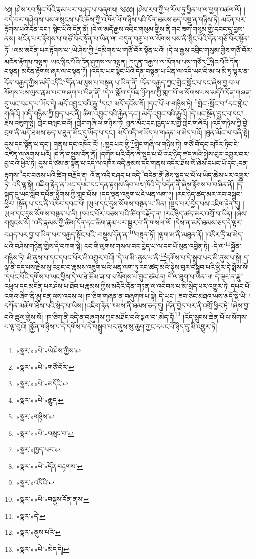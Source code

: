 ༄། །ཤེས་རབ་སྙིང་པོའི་རྣམ་པར་བཤད་པ་བཞུགས། ༄༅༅། །ཤེས་རབ་ཀྱི་ཕ་རོལ་ཏུ་ཕྱིན་པ་ལ་ཕྱག་འཚལ་ལོ། །བདེ་བར་གཤེགས་པས་གསུངས་པའི་ཆོས་ཀྱི་འཁོར་ལོ་གཉིས་པའི་དོན་ཐམས་ཅད་བསྡུ་ན་གཉིས་ཏེ། མངོན་པར་རྟོགས་པའི་དོན་དང་། སྙིང་པོའི་དོན་ནོ། །དེ་ལ་མདོ་རྒྱས་འབྲིང་གསུམ་གྱིས་ནི་གང་ཟག་གསུམ་གྱི་དབང་དུ་བྱས་ནས། མངོན་པར་རྟོགས་པ་གཙོ་བོར་སྟོན་པ་ཡིན་ལ། བདུན་བརྒྱ་པ་ལ་སོགས་པས་ནི་སྙིང་པོའི་དོན་གཙོ་བོར་སྟོན་ཏོ། །ལམ་མངོན་པར་རྟོགས་པ་:ཡེ་ཤེས་ཀྱི་\footnote{«སྣར་»«པེ་»ཡེ་ཤེས་ཀྱིས་}དམིགས་པ་གཙོ་བོར་སྟོན་པའོ། །དེ་ལ་རྒྱས་འབྲིང་གསུམ་གྱིས་གཙོ་བོར་མངོན་རྟོགས་བསྟན། ཡང་སྙིང་པོའི་དོན་ཤུགས་ལ་བསྟན། བདུན་བརྒྱ་པ་ལ་སོགས་པས་གཙོར་\footnote{«སྣར་»«པེ་»གཙོ་བོར་}སྙིང་པོའི་དོན་བསྟན། མངོན་རྟོགས་ཞར་ལ་བསྟན་ཏོ། །འདིར་ཡང་སྙིང་པོའི་དོན་བསྟན་པ་ཡིན་ལ་འདི་ཡང་བི་མ་ལ་མི་ཏྲ་ལྟར་ན་དོན་བརྒྱད་ཀྱིས་མདོ་འདིའི་\footnote{«སྣར་»«པེ་»མདོའི་}དོན་མ་ལུས་པ་བསྟན་པ་ཡིན་ནོ། །དོན་བརྒྱད་ཀྱང་གླེང་སློང་པ་དང་ཞེས་བྱ་བ་ལ་སོགས་པས་ལུས་རྣམ་པར་གཞག་པ་ཡིན་ནོ། །དེ་ལ་སློབ་དཔོན་ཕྱོགས་ཀྱི་གླང་པོ་ལ་སོགས་པས་མདོའི་དོན་གཞན་དུ་ཡང་བཤད་པ་ཡོད་དེ། མདོ་འབྱུང་བའི་རྒྱུ་\footnote{«སྣར་»«པེ་»རྒྱུད་}དང་། མདོ་དངོས་སོ། །དང་པོ་ལ་:གཉིས་ཏེ། \footnote{«སྣར་»གཉིས་}གླེང་:སློང་བ་\footnote{«སྣར་»«པེ་»བསླང་བ་}དང་གླེང་གཞིའོ། །འདི་གཉིས་ཀྱི་ཁྱད་པར་ནི། ཚིག་འབྱུང་བའི་རྐྱེན་དང་། མདོ་འབྱུང་བའི་རྒྱུའོ། །དེ་ཡང་སྔོན་བྱུང་བ་དང་། རྗེས་འཇུག་སྟེ། གླེང་བསླང་བའོ། །གླེང་གཞི་ལ་གཉིས་ཏེ། ཐུན་མོང་དང་ཁྱད་པར་གྱི་གླེང་གཞིའོ། །འདི་གཉིས་ཀྱི་བྱེ་བྲག་ནི་མདོ་ཐམས་ཅད་ལ་ཐུན་མོང་དུ་ཡོད་པ་དང་། མདོ་འདི་ལ་ཡོད་པ་གཞན་ལ་མེད་པའོ། །ཐུན་མོང་ལ་བཞི་སྟེ། དུས་དང་སྟོན་པ་དང་། གནས་དང་འཁོར་རོ། །:ཁྱད་པར་གྱི་\footnote{«སྣར་»ཁྱད་པར་}གླེང་གཞི་ལ་གཉིས་ཏེ། གཙོ་བོ་དང་འཁོར་ཏིང་ངེ་འཛིན་ལ་ཞུགས་པའོ། །དེ་ནི་བསྡུས་དོན་ནོ། །དགོས་པའི་དོན་ནི་སྡུད་པ་པོ་རང་ཉིད་ཚད་མའི་སྐྱེས་བུར་འགྱུར་བར་བྱ་བའི་ཕྱིར་ཏེ། དུས་དེ་ཙམ་ན་སྟོན་པ་འདི་ལ་འཁོར་འདི་རྣམས་དང་གནས་འདིར་ཐོས་སོ་ཞེས་དཔང་པོ་དང་:དན་རྟགས་\footnote{«སྣར་»«པེ་»དོན་བརྟགས་}དང་བཅས་པའི་ཚིག་བརྗོད་ན། འོ་ན་འདི་བཤད་པ་འདི་\footnote{«སྣར་»འདིའི་}བདེན་ནོ་ཞེས་སྡུད་པ་པོ་ལ་ཡིད་ཆེས་པར་འགྱུར་ཏེ། འདི་ལྟ་སྟེ། འཇིག་རྟེན་ན་ཡང་དཔང་དང་དན་རྟགས་ཞིབ་པས་ཁོའི་དེ་བདེན་ནོ་ཞེས་རྟོགས་པ་བཞིན་ནོ། །དེ་སྐད་དུ་ཡང་སློབ་དཔོན་ཕྱོགས་ཀྱི་གླང་པོས། །དད་ལྡན་འཇུག་པའི་ཡན་ལག་ཏུ། །རང་ཉིད་ཚད་མར་རབ་བསྒྲུབ་ཕྱིར། །སྟོན་པ་དང་ནི་འཁོར་དབང་པོ། །ཡུལ་དང་དུས་སོགས་བསྟན་པ་ཡིན། །སྡུད་པར་བྱེད་པས་འཇིག་རྟེན་དུ། །ཡུལ་དང་དུས་སོགས་བསྟན་པ་ནི། །དཔང་པོར་བཅས་པའི་ཚིག་བརྗོད་ན། །རང་ཉིད་ཚད་མར་འགྲོ་བ་ཡིན། །ཞེས་གསུངས་སོ། །འདི་རྣམས་ཀྱི་ཚིག་དོན་དང་ཚིག་རྣམ་པར་སྦྱར་བ་ནི་གསལ་ལོ། །དེས་ན་མདོ་ཐམས་ཅད་དེ་ལྟར་བཤད་པར་བྱ་བ་ཡིན་པར་བརྒྱད་སྟོང་པའི་:བསྡུས་དོན་ན་\footnote{«སྣར་»«པེ་»བསྡུས་དོན་ནས་}བསྟན་ཏོ། །ལྷག་མ་ནི་མཐུན་ནོ། །འདིར་དྲི་མ་མེད་པའི་བཤེས་གཉེན་གྱིས་དེ་བཀག་སྟེ། རང་གི་ལུགས་གསལ་བར་བྱེད་པ་ལ་དང་པོ་སུན་འབྱིན་ཏེ། :དེ་ལ་\footnote{«སྣར་»དེ་}སྐྱོན་གཉིས་ཏེ། མི་ནུས་པ་དང་དཔང་པོར་མི་འགྱུར་བའོ། །དེ་ལ་མི་:ནུས་པ་ནི་\footnote{«སྣར་»ནུས་པའི་}དགོས་པ་དེ་སྒྲུབ་པར་མི་ནུས་པ་སྟེ། ད་ལྟ་ནི་དད་པས་རྗེས་སུ་འབྲང་བ་རྣམས་འཇུག་པའི་ཡན་ལག་ཏུ་རང་ཚད་མའི་སྐྱེས་བུར་བསྒྲུབ་པའི་ཕྱིར་དེ་སྨོས་སོ། །དཔང་པོའི་དགོས་པ་ཡང་ཕྱིས་དེ་ལ་ཐེ་ཚོམ་ཟ་བ་ལ་སོགས་པ་བྱུང་ཙམ་ན། དེ་ལ་ཐུག་པ་ཡིན་ལ། དེ་ལྟར་ན་རྫུ་འཕྲུལ་དང་མངོན་པར་ཤེས་པ་ཐོབ་པ་རྣམས་ཀྱིས་མདོའི་དོན་གཏན་ལ་འབེབས་པ་མི་སྲིད་པར་འགྱུར་ཏེ། དཔང་པོ་འགའ་ཞིག་ནི་མྱ་ངན་ལས་འདས་ལ། ཁ་ཅིག་གཞན་ན་བཞུགས་པ་སྟེ། དེ་ཡང་། ཟབ་ཅིང་མཐའ་ཡས་མདོ་སྡེ་ཡི། །དཀོན་མཆོག་ཐོས་པའི་སྲེད་པ་ཡིས། །འཇིག་རྟེན་ཁམས་ནི་ཐམས་ཅད་དུ། །དོན་བྱེད་པར་ནི་འགྲོ་ཕྱིར་ཏེ། །ཞེས་བྱ་བའི་ཚུལ་གྱིས་སོ། །ཁ་ཅིག་ནི་འདི་ན་བཞུགས་ཀྱང་མཐོང་བའི་སྐལ་བ་:མེད་དོ།\footnote{«སྣར་»«པེ་»མེད་དེ།} །འོད་སྲུངས་ཆེན་པོ་ལ་སོགས་པ་ལྟ་བུའོ། །སྐྱོན་གཉིས་པ་དེ་དགོས་པ་དེ་བསྒྲུབ་པར་ནུས་སུ་ཆུག་ཀྱང་དཔང་པོ་ཉིད་དུ་མི་འགྱུར་ཏེ། 